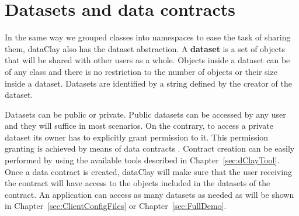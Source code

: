 % 
% 
% 
% 

\section{Datasets and data contracts}

In the same way we grouped classes into namespaces to ease the task of sharing them, dataClay also has the dataset abstraction. A {\bf dataset} is a set of objects that will be shared with other users as a whole. Objects inside a dataset can be of any class and there is no restriction to the number of objects or their size inside a dataset. Datasets are identified by a string defined by the creator of the dataset.

Datasets can be public or private. Public datasets can be accessed by any user and they will suffice in most scenarios. On the contrary, to access a private dataset its owner has to explicitly grant permission to it. This permission granting is achieved by means of data contracts . Contract creation can be easily performed by using the available tools described in Chapter~\ref{sec:dClayTool}. Once a data contract is created, dataClay will make sure that the user receiving the contract will have access to the objects included in the datasets of the contract. An application can access as many datasets as needed as will be shown in Chapter~\ref{sec:ClientConfigFiles} or Chapter~\ref{sec:FullDemo}.

